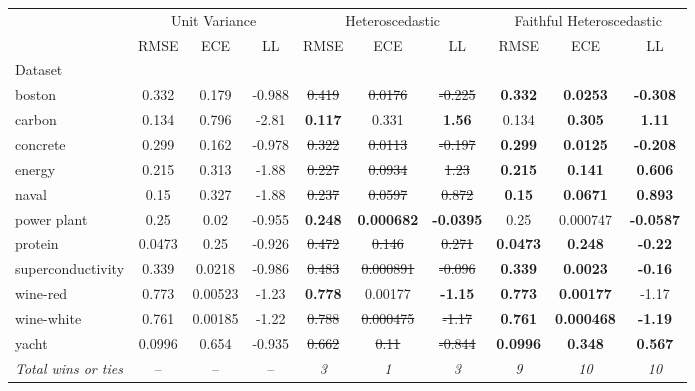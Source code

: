\begin{tabular}{l|ccc|ccc|ccc}
\toprule
 & \multicolumn{3}{|c}{Unit Variance} & \multicolumn{3}{|c}{Heteroscedastic} & \multicolumn{3}{|c}{Faithful Heteroscedastic} \\
 & RMSE & ECE & LL & RMSE & ECE & LL & RMSE & ECE & LL \\
Dataset &  &  &  &  &  &  &  &  &  \\
\midrule
boston & 0.332 & 0.179 & -0.988 & \sout{0.419} & \sout{0.0176} & \sout{-0.225} & \textbf{0.332} & \textbf{0.0253} & \textbf{-0.308} \\
carbon & 0.134 & 0.796 & -2.81 & \textbf{0.117} & 0.331 & \textbf{1.56} & 0.134 & \textbf{0.305} & \textbf{1.11} \\
concrete & 0.299 & 0.162 & -0.978 & \sout{0.322} & \sout{0.0113} & \sout{-0.197} & \textbf{0.299} & \textbf{0.0125} & \textbf{-0.208} \\
energy & 0.215 & 0.313 & -1.88 & \sout{0.227} & \sout{0.0934} & \sout{1.23} & \textbf{0.215} & \textbf{0.141} & \textbf{0.606} \\
naval & 0.15 & 0.327 & -1.88 & \sout{0.237} & \sout{0.0597} & \sout{0.872} & \textbf{0.15} & \textbf{0.0671} & \textbf{0.893} \\
power plant & 0.25 & 0.02 & -0.955 & \textbf{0.248} & \textbf{0.000682} & \textbf{-0.0395} & 0.25 & 0.000747 & \textbf{-0.0587} \\
protein & 0.0473 & 0.25 & -0.926 & \sout{0.472} & \sout{0.146} & \sout{0.271} & \textbf{0.0473} & \textbf{0.248} & \textbf{-0.22} \\
superconductivity & 0.339 & 0.0218 & -0.986 & \sout{0.483} & \sout{0.000891} & \sout{-0.096} & \textbf{0.339} & \textbf{0.0023} & \textbf{-0.16} \\
wine-red & 0.773 & 0.00523 & -1.23 & \textbf{0.778} & 0.00177 & \textbf{-1.15} & \textbf{0.773} & \textbf{0.00177} & -1.17 \\
wine-white & 0.761 & 0.00185 & -1.22 & \sout{0.788} & \sout{0.000475} & \sout{-1.17} & \textbf{0.761} & \textbf{0.000468} & \textbf{-1.19} \\
yacht & 0.0996 & 0.654 & -0.935 & \sout{0.662} & \sout{0.11} & \sout{-0.844} & \textbf{0.0996} & \textbf{0.348} & \textbf{0.567} \\
\textit{{Total wins or ties}} & -- & -- & -- & \textit{3} & \textit{1} & \textit{3} & \textit{9} & \textit{10} & \textit{10} \\
\bottomrule
\end{tabular}
